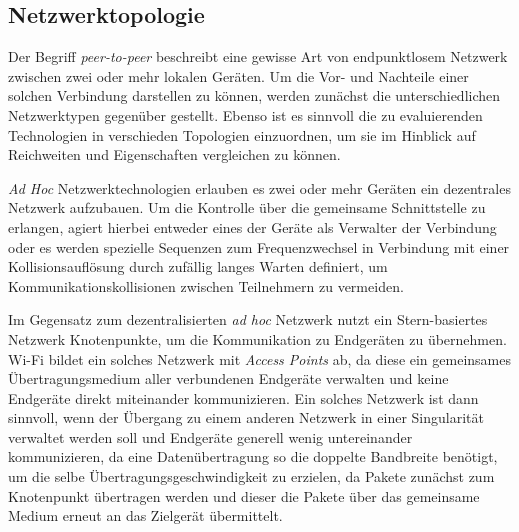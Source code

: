     
    
    \subsection{Netzwerktopologie}
    
    Der Begriff {\it peer-to-peer} beschreibt eine gewisse Art von endpunktlosem Netzwerk zwischen zwei oder mehr lokalen Geräten. Um die Vor- und Nachteile einer solchen Verbindung darstellen zu können, werden zunächst die unterschiedlichen Netzwerktypen gegenüber gestellt. Ebenso ist es sinnvoll die zu evaluierenden Technologien in verschieden Topologien einzuordnen, um sie im Hinblick auf Reichweiten und Eigenschaften vergleichen zu können.
    
    {\it Ad Hoc} Netzwerktechnologien erlauben es zwei oder mehr Geräten ein dezentrales Netzwerk aufzubauen. Um die Kontrolle über die gemeinsame Schnittstelle zu erlangen, agiert hierbei entweder eines der Geräte als Verwalter der Verbindung oder es werden spezielle Sequenzen zum Frequenzwechsel in Verbindung mit einer Kollisionsauflösung durch zufällig langes Warten definiert, um Kommunikationskollisionen zwischen Teilnehmern zu vermeiden.
    
    Im Gegensatz zum dezentralisierten {\it ad hoc} Netzwerk nutzt ein Stern-basiertes Netzwerk Knotenpunkte, um die Kommunikation zu Endgeräten zu übernehmen. Wi-Fi bildet ein solches Netzwerk mit {\it Access Points} ab, da diese ein gemeinsames Übertragungsmedium aller verbundenen Endgeräte verwalten und keine Endgeräte direkt miteinander kommunizieren. Ein solches Netzwerk ist dann sinnvoll, wenn der Übergang zu einem anderen Netzwerk in einer Singularität verwaltet werden soll und Endgeräte generell wenig untereinander kommunizieren, da eine Datenübertragung so die doppelte Bandbreite benötigt, um die selbe Übertragungsgeschwindigkeit zu erzielen, da Pakete zunächst zum Knotenpunkt übertragen werden und dieser die Pakete über das gemeinsame Medium erneut an das Zielgerät übermittelt.

